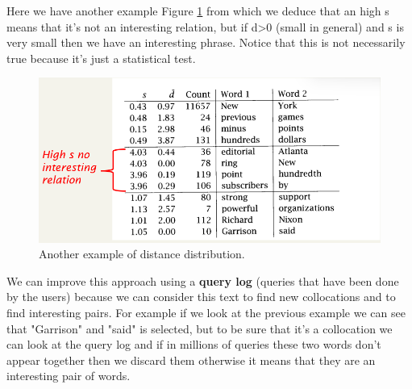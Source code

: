 Here we have another example Figure \ref{fig:distancedistribution2} from which we deduce that an high s means that it's not an interesting relation, but if d>0 (small in general) and s is very small then we have an interesting phrase. Notice that this is not necessarily true because it's just a statistical test.\newline
\begin{figure}
    \centering
    \includegraphics[width=0.75\linewidth]{images/exampledistance2.png}
    \caption{Another example of distance distribution.}
    \label{fig:distancedistribution2}
\end{figure}
We can improve this approach using a \textbf{query log} (queries that have been done by the users) because we can consider this text to find new collocations and to find interesting pairs. For example if we look at the previous example we can see that "Garrison" and "said" is selected, but to be sure that it's a collocation we can look at the query log and if in millions of queries these two words don't appear together then we discard them otherwise it means that they are an interesting pair of words.\newline
